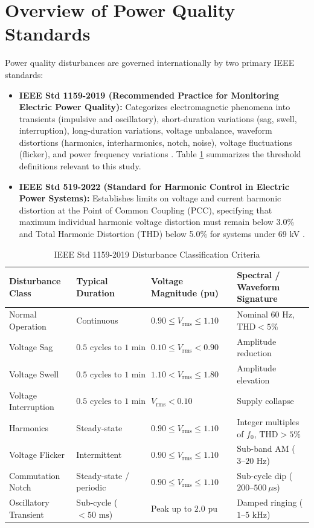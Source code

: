 \documentclass[12pt,a4paper]{report}
\begin{document}
\section{Overview of Power Quality Standards}
Power quality disturbances are governed internationally by two primary IEEE standards:
\begin{itemize}
    \item \textbf{IEEE Std 1159-2019 (Recommended Practice for Monitoring Electric Power Quality):} Categorizes electromagnetic phenomena into transients (impulsive and oscillatory), short-duration variations (sag, swell, interruption), long-duration variations, voltage unbalance, waveform distortions (harmonics, interharmonics, notch, noise), voltage fluctuations (flicker), and power frequency variations \cite{ieee1159}. Table \ref{tab:ieee1159_definitions} summarizes the threshold definitions relevant to this study.
    \item \textbf{IEEE Std 519-2022 (Standard for Harmonic Control in Electric Power Systems):} Establishes limits on voltage and current harmonic distortion at the Point of Common Coupling (PCC), specifying that maximum individual harmonic voltage distortion must remain below 3.0\% and Total Harmonic Distortion (THD) below 5.0\% for systems under 69 kV \cite{ieee519}.
\end{itemize}

\begin{table}[H]
\centering
\caption{IEEE Std 1159-2019 Disturbance Classification Criteria}
\label{tab:ieee1159_definitions}
\small
\begin{tabularx}{\textwidth}{p{3.2cm}p{3.0cm}p{3.6cm}X}
\toprule
\textbf{Disturbance Class} & \textbf{Typical Duration} & \textbf{Voltage Magnitude (pu)} & \textbf{Spectral / Waveform Signature} \\
\midrule
Normal Operation & Continuous & $0.90 \le V_{\text{rms}} \le 1.10$ & Nominal $60\text{ Hz}$, $\text{THD} < 5\%$ \\
Voltage Sag & $0.5\text{ cycles to }1\text{ min}$ & $0.10 \le V_{\text{rms}} < 0.90$ & Amplitude reduction \\
Voltage Swell & $0.5\text{ cycles to }1\text{ min}$ & $1.10 < V_{\text{rms}} \le 1.80$ & Amplitude elevation \\
Voltage Interruption & $0.5\text{ cycles to }1\text{ min}$ & $V_{\text{rms}} < 0.10$ & Supply collapse \\
Harmonics & Steady-state & $0.90 \le V_{\text{rms}} \le 1.10$ & Integer multiples of $f_0$, $\text{THD} > 5\%$ \\
Voltage Flicker & Intermittent & $0.90 \le V_{\text{rms}} \le 1.10$ & Sub-band AM ($3\text{--}20\text{ Hz}$) \\
Commutation Notch & Steady-state / periodic & $0.90 \le V_{\text{rms}} \le 1.10$ & Sub-cycle dip ($200\text{--}500\ \mu\text{s}$) \\
Oscillatory Transient & Sub-cycle ($< 50\text{ ms}$) & Peak up to $2.0\text{ pu}$ & Damped ringing ($1\text{--}5\text{ kHz}$) \\
\bottomrule
\end{tabularx}
\end{table}
\end{document}
